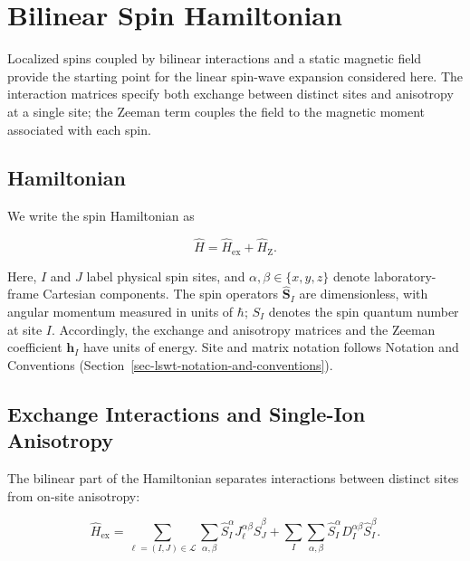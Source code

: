 
\hypertarget{sec-lswt-bilinear-spin-hamiltonian}{%
\section{Bilinear Spin Hamiltonian}\label{sec-lswt-bilinear-spin-hamiltonian}}

Localized spins coupled by bilinear interactions and a static magnetic field provide the starting point for the linear spin-wave expansion considered here. The interaction matrices specify both exchange between distinct sites and anisotropy at a single site; the Zeeman term couples the field to the magnetic moment associated with each spin.

\subsection{Hamiltonian}

We write the spin Hamiltonian as

\begin{equation}\label{eq-lswt-bilinear-spin-hamiltonian}
\hat H
=\hat H_{\mathrm{ex}}+\hat H_{\mathrm Z}.
\end{equation}

Here, \(I\) and \(J\) label physical spin sites, and \(\alpha,\beta\in\{x,y,z\}\) denote laboratory-frame Cartesian components. The spin operators \(\hat{\mathbf S}_I\) are dimensionless, with angular momentum measured in units of \(\hbar\); \(S_I\) denotes the spin quantum number at site \(I\). Accordingly, the exchange and anisotropy matrices and the Zeeman coefficient \(\mathbf h_I\) have units of energy. Site and matrix notation follows Notation and Conventions (Section~\ref{sec-lswt-notation-and-conventions}).

\subsection{Exchange Interactions and Single-Ion Anisotropy}

The bilinear part of the Hamiltonian separates interactions between distinct sites from on-site anisotropy:

\begin{equation}\label{eq-lswt-bilinear-exchange-support}
\hat H_{\mathrm{ex}}
=
\sum_{\ell=(I,J)\in\mathcal L}
\sum_{\alpha,\beta}
\hat S_I^{\alpha}J_{\ell}^{\alpha\beta}\hat S_J^{\beta}
+
\sum_I
\sum_{\alpha,\beta}
\hat S_I^\alpha D_I^{\alpha\beta}\hat S_I^\beta.
\end{equation}

